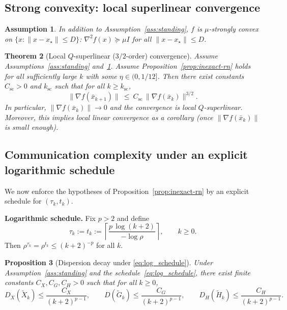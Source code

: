 \documentclass[11pt,a4paper]{article}
\newtheorem{theorem}{Theorem}[section]
\newtheorem{proposition}[theorem]{Proposition}
\newtheorem{assumption}[theorem]{Assumption}
\begin{document}
\subsection{Strong convexity: local superlinear convergence}
\begin{assumption}\label{ass:strong}
	In addition to Assumption~\ref{ass:standing}, $f$ is $\mu$-strongly convex on $\{x:\|x-x_\star\|\le D\}$:
	$\nabla^2 f(x)\succeq \mu I$ for all $\|x-x_\star\|\le D$.
\end{assumption}

\begin{theorem}[Local $Q$-superlinear ($3/2$-order) convergence]\label{thm:sc-superlinear}
	Assume Assumptions~\ref{ass:standing} and~\ref{ass:strong}.
	Assume Proposition~\ref{prop:inexact-rn} holds for all sufficiently large $k$ with some $\eta\in(0,1/12]$.
	Then there exist constants $C_{\mathrm{sc}}>0$ and $k_{\mathrm{sc}}$ such that for all $k\ge k_{\mathrm{sc}}$,
	\[
	\|\nabla f(\bar x_{k+1})\|\ \le\ C_{\mathrm{sc}}\,\|\nabla f(\bar x_k)\|^{3/2}.
	\]
	In particular, $\|\nabla f(\bar x_k)\|\to 0$ and the convergence is local $Q$-superlinear.
	Moreover, this implies local linear convergence as a corollary (once $\|\nabla f(\bar x_k)\|$ is small enough).
\end{theorem}

\subsection{Communication complexity under an explicit logarithmic schedule}\label{ssec:comm_schedule}
We now enforce the hypotheses of Proposition~\ref{prop:inexact-rn} by an explicit schedule for $(\tau_k,t_k)$.

\noindent\textbf{Logarithmic schedule.}
Fix $p>2$ and define
\begin{equation}\label{eq:log_schedule}
	\tau_k:=t_k:=\left\lceil \frac{p\,\log(k+2)}{-\log\rho}\right\rceil,\qquad k\ge 0.
\end{equation}
Then $\rho^{\tau_k}=\rho^{t_k}\le (k+2)^{-p}$ for all $k$.

\begin{proposition}[Dispersion decay under \eqref{eq:log_schedule}]\label{prop:dispersion_decay}
	Under Assumption~\ref{ass:standing} and the schedule~\eqref{eq:log_schedule},
	there exist finite constants $C_X,C_G,C_H>0$ such that for all $k\ge 0$,
	\[
	D_X(\tilde X_k)\le \frac{C_X}{(k+2)^{p-1}},\qquad
	D(\tilde G_k)\le \frac{C_G}{(k+2)^{p-1}},\qquad
	D_H(\tilde H_k)\le \frac{C_H}{(k+2)^{p-1}}.
	\]
\end{proposition}
\end{document}

